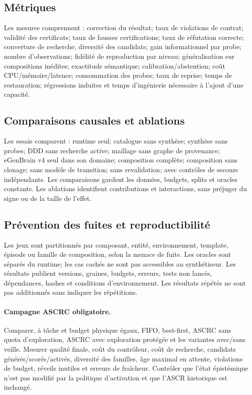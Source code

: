 \documentclass[11pt,a4paper]{article}
\begin{document}
\subsection{Métriques}
Les mesures comprennent : correction du résultat; taux de violations de contrat; validité des certificats; taux de fausses certifications; taux de réfutation correcte; couverture de recherche; diversité des candidats; gain informationnel par probe; nombre d'observations; fidélité de reproduction par niveau; généralisation sur compositions inédites; exactitude sémantique; calibration/abstention; coût CPU/mémoire/latence; consommation des probes; taux de reprise; temps de restauration; régressions induites et temps d'ingénierie nécessaire à l'ajout d'une capacité.

\subsection{Comparaisons causales et ablations}
Les essais comparent : runtime seul; catalogue sans synthèse; synthèse sans probes; DDD sans recherche active; maillage sans graphe de provenance; eGenBrain v4 seul dans son domaine; composition complète; composition sans clonage; sans modèle de transition; sans revalidation; avec contrôles de secours indépendants. Les comparaisons gardent les données, budgets, splits et oracles constants. Les ablations identifient contributions et interactions, sans préjuger du signe ou de la taille de l'effet.

\subsection{Prévention des fuites et reproductibilité}
Les jeux sont partitionnés par composant, entité, environnement, template, épisode ou famille de composition, selon la menace de fuite. Les oracles sont séparés du runtime; les cas cachés ne sont pas accessibles au synthétiseur. Les résultats publient versions, graines, budgets, erreurs, tests non lancés, dépendances, hashes et conditions d'environnement. Les résultats répétés ne sont pas additionnés sans indiquer les répétitions.

\paragraph{Campagne ASCRC obligatoire.} Comparer, à tâche et budget physique égaux, FIFO, best-first, ASCRC sans quota d'exploration, ASCRC avec exploration protégée et les variantes avec/sans veille. Mesurer qualité finale, coût du contrôleur, coût de recherche, candidats générés/scorés/activés, diversité des familles, âge maximal en attente, violations de budget, réveils inutiles et erreurs de fraîcheur. Contrôler que l'état épistémique n'est pas modifié par la politique d'activation et que l'ASCR historique est inchangé.
\end{document}
